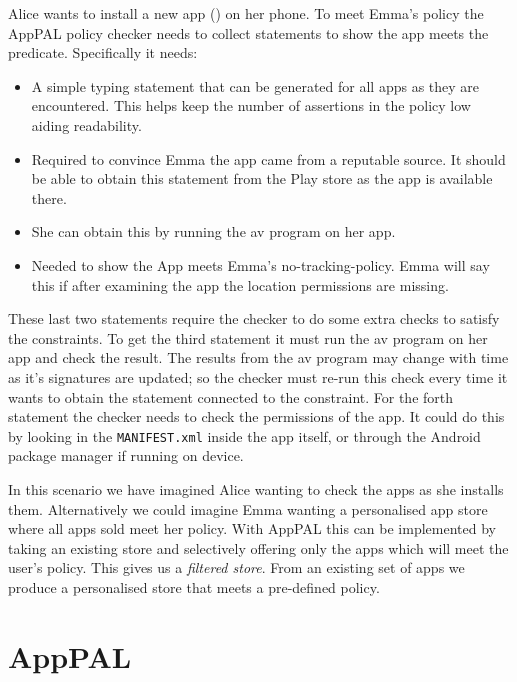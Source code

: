 \documentclass[]{llncs}
\begin{document}
Alice wants to install a new app () on her phone.
To meet Emma's policy the AppPAL policy checker needs to collect statements to show the app meets the  predicate.
Specifically it needs:
\begin{itemize}
  \item{}
    A simple typing statement that can be generated for all apps as they are encountered.
    This helps keep the number of  assertions in the policy low aiding readability.
  \item{}
    Required to convince Emma the app came from a reputable source.
    It should be able to obtain this statement from the Play store as the app is available there.
  \item{}
    She can obtain this by running the \ac{av} program on her app.
  \item{}
    Needed to show the App meets Emma's no-tracking-policy.
    Emma will say this if after examining the app the location permissions are missing.
\end{itemize}
These last two statements require the checker to do some extra checks to satisfy the constraints.
To get the third statement it must run the \ac{av} program on her app and check the result.
The results from the \ac{av} program may change with time as it's signatures are updated;
  so the checker must re-run this check every time it wants to obtain the statement connected to the constraint.
For the forth statement the checker needs to check the permissions of the app.
It could do this by looking in the \texttt{MANIFEST.xml} inside the app itself, or through the Android package manager if running on device.

In this scenario we have imagined Alice wanting to check the apps as she installs them.
Alternatively we could imagine Emma wanting a personalised app store where all apps sold meet her policy.
With AppPAL this can be implemented by taking an existing store and selectively offering only the apps which will meet the user's policy.
This gives us a \emph{filtered store}.
From an existing set of apps we produce a personalised store that meets a pre-defined policy.

\section{AppPAL}
\label{sec:details}
\label{ssec:language}
\end{document}
